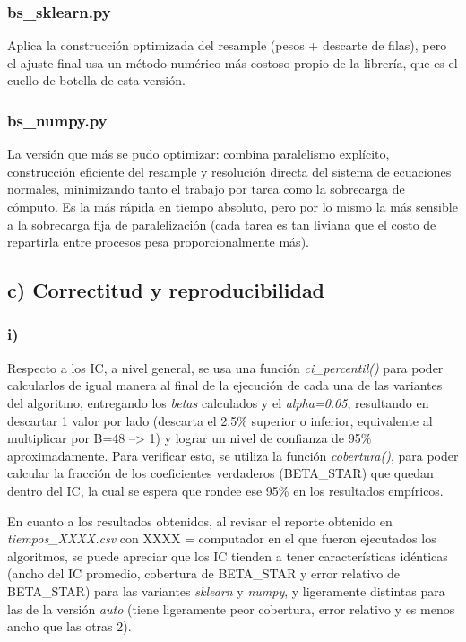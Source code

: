 \documentclass[11pt]{article}
\begin{document}
\subsubsection*{bs\_sklearn.py}

Aplica la construcci\'on optimizada del resample (pesos + descarte de filas), pero el ajuste final usa un m\'etodo num\'erico m\'as costoso propio de la librer\'ia, que es el cuello de botella de esta versi\'on.

\subsubsection*{bs\_numpy.py}

La versi\'on que m\'as se pudo optimizar: combina paralelismo expl\'icito, construcci\'on eficiente del resample y resoluci\'on directa del sistema de ecuaciones normales, minimizando tanto el trabajo por tarea como la sobrecarga de c\'omputo. Es la m\'as r\'apida en tiempo absoluto, pero por lo mismo la m\'as sensible a la sobrecarga fija de paralelizaci\'on (cada tarea es tan liviana que el costo de repartirla entre procesos pesa proporcionalmente m\'as).

\subsection*{c) Correctitud y reproducibilidad}

\subsubsection*{i)}

Respecto a los IC, a nivel general, se usa una funci\'on \textit{ci\_percentil()} para poder calcularlos de igual manera al final de la ejecuci\'on de cada una de las variantes del algoritmo, entregando los \textit{betas} calculados y el \textit{alpha=0.05}, resultando en descartar 1 valor por lado (descarta el 2.5\% superior o inferior, equivalente al multiplicar por B=48 --> 1) y lograr un nivel de confianza de 95\% aproximadamente. Para verificar esto, se utiliza la funci\'on \textit{cobertura()}, para poder calcular la fracci\'on de los coeficientes verdaderos (BETA\_STAR) que quedan dentro del IC, la cual se espera que rondee ese 95\% en los resultados emp\'iricos.

En cuanto a los resultados obtenidos, al revisar el reporte obtenido en \textit{tiempos\_XXXX.csv} con XXXX = computador en el que fueron ejecutados los algoritmos, se puede apreciar que los IC tienden a tener caracter\'isticas id\'enticas (ancho del IC promedio, cobertura de BETA\_STAR y error relativo de BETA\_STAR) para las variantes \textit{sklearn} y \textit{numpy}, y ligeramente distintas para las de la versi\'on \textit{auto} (tiene ligeramente peor cobertura, error relativo y es menos ancho que las otras 2).
\end{document}

